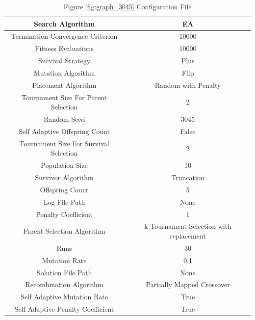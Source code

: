 \documentclass{standalone}
\begin{document}
\begin{table}[!htb]
	\centering
	\caption{Figure \ref{fig:graph_3045} Configuration File}
	\label{tab:graph_3045}
	\begin{tabular}{| c | c |}
		\hline
		Search Algorithm		& EA		 \\
		\hline
		Termination Convergence Criterion		& 10000		 \\
		\hline
		Fitness Evaluations		& 10000		 \\
		\hline
		Survival Strategy		& Plus		 \\
		\hline
		Mutation Algorithm		& Flip		 \\
		\hline
		Placement Algorithm		& Random with Penalty		 \\
		\hline
		Tournament Size For Parent Selection		& 2		 \\
		\hline
		Random Seed		& 3045		 \\
		\hline
		Self Adaptive Offspring Count		& False		 \\
		\hline
		Tournament Size For Survival Selection		& 2		 \\
		\hline
		Population Size		& 10		 \\
		\hline
		Survivor Algorithm		& Truncation		 \\
		\hline
		Offspring Count		& 5		 \\
		\hline
		Log File Path		& None		 \\
		\hline
		Penalty Coefficient		& 1		 \\
		\hline
		Parent Selection Algorithm		& k-Tournament Selection with replacement		 \\
		\hline
		Runs		& 30		 \\
		\hline
		Mutation Rate		& 0.1		 \\
		\hline
		Solution File Path		& None		 \\
		\hline
		Recombination Algorithm		& Partially Mapped Crossover		 \\
		\hline
		Self Adaptive Mutation Rate		& True		 \\
		\hline
		Self Adaptive Penalty Coefficient		& True		 \\
		\hline
	\end{tabular}
\end{table}
\end{document}
